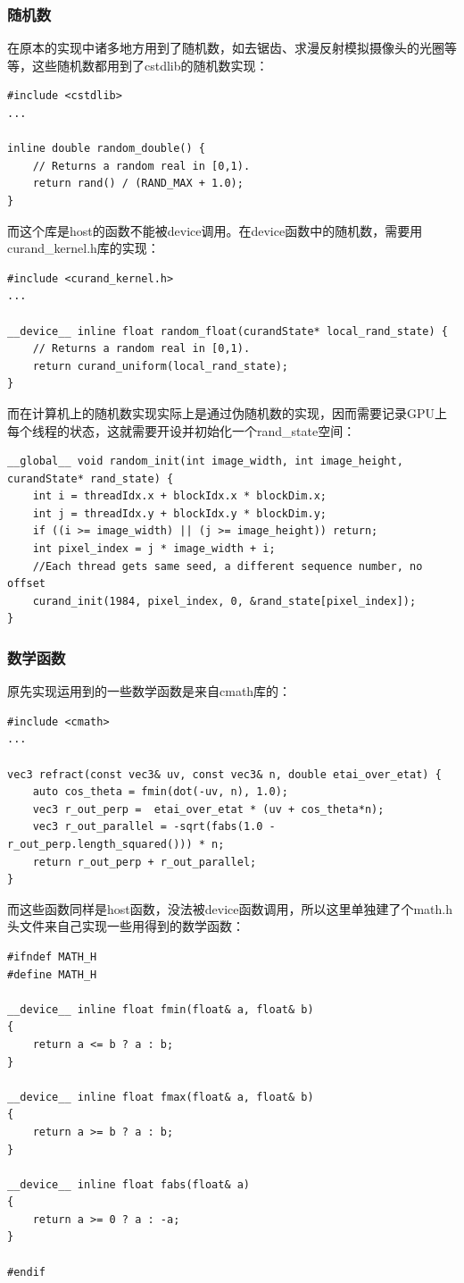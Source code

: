 \documentclass[UTF8, a4paper, 11pt]{article}
\begin{document}
\subsubsection{随机数}
在原本的实现中诸多地方用到了随机数，如去锯齿、求漫反射模拟摄像头的光圈等等，这些随机数都用到了cstdlib的随机数实现：
\begin{lstlisting}
#include <cstdlib>
...

inline double random_double() {
    // Returns a random real in [0,1).
    return rand() / (RAND_MAX + 1.0);
}
\end{lstlisting}
而这个库是host的函数不能被device调用。在device函数中的随机数，需要用curand\_kernel.h库的实现：
\begin{lstlisting}
#include <curand_kernel.h>
...

__device__ inline float random_float(curandState* local_rand_state) {
    // Returns a random real in [0,1).
    return curand_uniform(local_rand_state);
}
\end{lstlisting}
而在计算机上的随机数实现实际上是通过伪随机数的实现，因而需要记录GPU上每个线程的状态，这就需要开设并初始化一个rand\_state空间：
\begin{lstlisting}
__global__ void random_init(int image_width, int image_height, curandState* rand_state) {
	int i = threadIdx.x + blockIdx.x * blockDim.x;
	int j = threadIdx.y + blockIdx.y * blockDim.y;
	if ((i >= image_width) || (j >= image_height)) return;
	int pixel_index = j * image_width + i;
	//Each thread gets same seed, a different sequence number, no offset
	curand_init(1984, pixel_index, 0, &rand_state[pixel_index]);
}
\end{lstlisting}
\subsubsection{数学函数}
原先实现运用到的一些数学函数是来自cmath库的：
\begin{lstlisting}
#include <cmath>
...

vec3 refract(const vec3& uv, const vec3& n, double etai_over_etat) {
    auto cos_theta = fmin(dot(-uv, n), 1.0);
    vec3 r_out_perp =  etai_over_etat * (uv + cos_theta*n);
    vec3 r_out_parallel = -sqrt(fabs(1.0 - r_out_perp.length_squared())) * n;
    return r_out_perp + r_out_parallel;
}
\end{lstlisting}
而这些函数同样是host函数，没法被device函数调用，所以这里单独建了个math.h头文件来自己实现一些用得到的数学函数：
\begin{lstlisting}
#ifndef MATH_H
#define MATH_H

__device__ inline float fmin(float& a, float& b)
{
    return a <= b ? a : b;
}

__device__ inline float fmax(float& a, float& b)
{
    return a >= b ? a : b;
}

__device__ inline float fabs(float& a)
{
    return a >= 0 ? a : -a;
}

#endif
\end{lstlisting}
\end{document}
